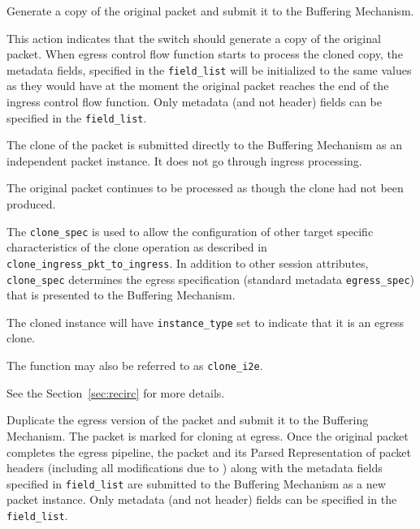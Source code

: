 \documentclass[12pt]{article}
\begin{document}
{ %
Generate a copy of the original packet and submit it to the Buffering Mechanism.
}
{ %
}
{ %
{
This action indicates that the switch should generate a copy of the original packet. When egress control flow function starts to process the cloned copy, the metadata fields, specified in the \texttt{field_list} will be initialized to the same values as they would have at the moment the original packet reaches the end of the ingress control flow function. Only metadata (and not header) fields can be specified in the \texttt{field_list}.
}

The clone of the packet is submitted directly to the Buffering Mechanism as
an independent packet instance. It does not go through ingress \matchaction
processing.

The original packet continues to be processed as though the clone had not
been produced.

The \texttt{clone_spec} is used to allow the configuration of other target specific
characteristics of the clone operation as described in \texttt{clone_ingress_pkt_to_ingress}.
In addition to other session attributes, \texttt{clone_spec} determines the egress
specification (standard metadata \texttt{egress_spec}) that is presented to the
Buffering Mechanism.

The cloned instance will have \texttt{instance_type} set to indicate that it is an
egress clone.

The function may also be referred to as \texttt{clone_i2e}.

See the Section~\ref{sec:recirc} for more details.

}


{ %
Duplicate the egress version of the packet and submit it to the Buffering
Mechanism.
}
{ %
}
{ %
The packet is marked for cloning at egress. Once the original packet completes
the egress pipeline, the packet and its Parsed Representation of packet headers
(including all modifications due to \matchaction) along with the metadata
fields specified in \texttt{field_list} are submitted to the Buffering Mechanism as
a new packet instance. Only metadata (and not header) fields can be specified in the \texttt{field_list}.
}
\end{document}
